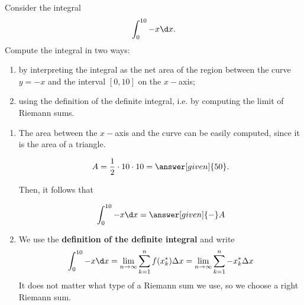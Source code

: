 \documentclass{ximera}
\begin{document}
\begin{example}
Consider the integral
\[
\int_0^{10}-x \d x.
\]
Compute the integral in two ways:
\begin{enumerate}
\item by interpreting the integral as the net area of the region between the curve $y=-x$ and the interval $[0,10]$ on  the $x-$axis;
\item using the definition of the definite integral, i.e. by computing the limit of Riemann sums.
\end{enumerate}
\begin{explanation}
\begin{enumerate}
\item The  area between the $x-$axis and the curve can be easily computed, since it is the area of a triangle.
\begin{image}
\end{image}

\[
A=\frac{1}{2}\cdot 10\cdot10=\answer[given]{50}.
\]

Then, it follows that

\[
\int_0^{10}-x \d x=\answer[given]{-}A
\]
\item We use the \textbf{definition of the definite integral} and write
\[
\int_0^{10}-x \d x=\lim_{n\to\infty}\sum_{k=1}^n f(x_k^*)\Delta x=\lim_{n\to\infty}\sum_{k=1}^n -x_k^*\Delta x
\]
It does not matter what  type of a Riemann sum we use, so we choose a right Riemann sum.


\end{enumerate}
\end{explanation}
\end{example}
\end{document}
